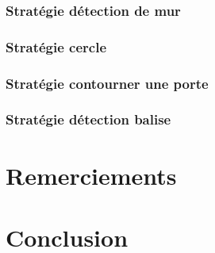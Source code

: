 \documentclass[12pt]{article}
\begin{document}
\subsubsection{Stratégie détection de mur}
\subsubsection{Stratégie cercle}
\subsubsection{Stratégie contourner une porte}
\subsubsection{Stratégie détection balise}

\newpage

\section{Remerciements}

\newpage

\section{Conclusion}
\end{document}

